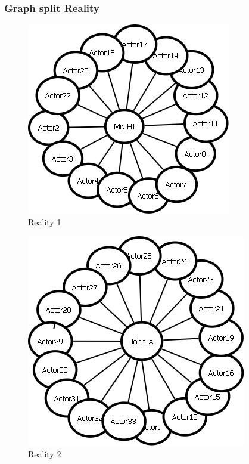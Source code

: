 \documentclass[12pt]{article}
\begin{document}
\subsubsection{Graph split Reality}
\begin{figure}[ht]
\includegraphics[scale=0.7]{../reality1}
\centering
\caption{Reality 1}
\label{fig:Graph in split Reality 1}
\end{figure}
\newpage
\begin{figure}[ht]
\includegraphics[scale=0.7]{../reality2}
\centering
\caption{Reality 2}
\label{fig:Graph in split Reality 2}
\end{figure}
\newpage
\end{document}
